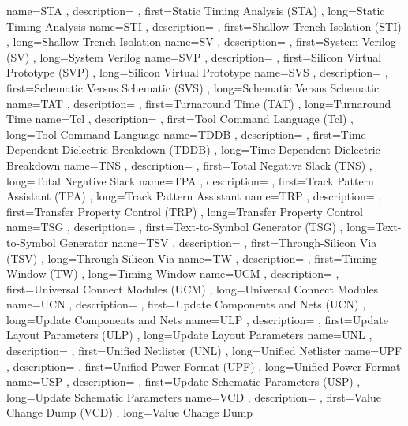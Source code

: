 { name={STA}
, description={}
, first={Static Timing Analysis (STA)}
, long={Static Timing Analysis}
}
{ name={STI}
, description={}
, first={Shallow Trench Isolation (STI)}
, long={Shallow Trench Isolation}
}
{ name={SV}
, description={}
, first={System Verilog (SV)}
, long={System Verilog}
}
{ name={SVP}
, description={}
, first={Silicon Virtual Prototype (SVP)}
, long={Silicon Virtual Prototype}
}
{ name={SVS}
, description={}
, first={Schematic Versus Schematic (SVS)}
, long={Schematic Versus Schematic}
}
{ name={TAT}
, description={}
, first={Turnaround Time (TAT)}
, long={Turnaround Time}
}
{ name={Tcl}
, description={}
, first={Tool Command Language (Tcl)}
, long={Tool Command Language}
}
{ name={TDDB}
, description={}
, first={Time Dependent Dielectric Breakdown (TDDB)}
, long={Time Dependent Dielectric Breakdown}
}
{ name={TNS}
, description={}
, first={Total Negative Slack (TNS)}
, long={Total Negative Slack}
}
{ name={TPA}
, description={}
, first={Track Pattern Assistant (TPA)}
, long={Track Pattern Assistant}
}
{ name={TRP}
, description={}
, first={Transfer Property Control (TRP)}
, long={Transfer Property Control}
}
{ name={TSG}
, description={}
, first={Text-to-Symbol Generator (TSG)}
, long={Text-to-Symbol Generator}
}
{ name={TSV}
, description={}
, first={Through-Silicon Via (TSV)}
, long={Through-Silicon Via}
}
{ name={TW}
, description={}
, first={Timing Window (TW)}
, long={Timing Window}
}
{ name={UCM}
, description={}
, first={Universal Connect Modules (UCM)}
, long={Universal Connect Modules}
}
{ name={UCN}
, description={}
, first={Update Components and Nets (UCN)}
, long={Update Components and Nets}
}
{ name={ULP}
, description={}
, first={Update Layout Parameters (ULP)}
, long={Update Layout Parameters}
}
{ name={UNL}
, description={}
, first={Unified Netlister (UNL)}
, long={Unified Netlister}
}
{ name={UPF}
, description={}
, first={Unified Power Format (UPF)}
, long={Unified Power Format}
}
{ name={USP}
, description={}
, first={Update Schematic Parameters (USP)}
, long={Update Schematic Parameters}
}
{ name={VCD}
, description={}
, first={Value Change Dump (VCD)}
, long={Value Change Dump}
}
